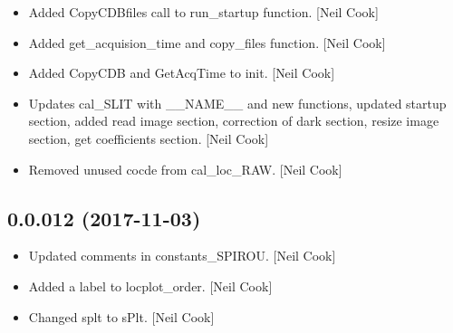 \documentclass[a4paper,10pt,english]{report}
\begin{document}
\begin{itemize}
\item {} 
Added CopyCDBfiles call to run\_startup function. {[}Neil Cook{]}

\item {} 
Added get\_acquision\_time and copy\_files function. {[}Neil Cook{]}

\item {} 
Added CopyCDB and GetAcqTime to init. {[}Neil Cook{]}

\item {} 
Updates cal\_SLIT with \_\_NAME\_\_ and new functions, updated startup
section, added read image section, correction of dark section, resize
image section, get coefficients section. {[}Neil Cook{]}

\item {} 
Removed unused cocde from cal\_loc\_RAW. {[}Neil Cook{]}

\end{itemize}


\subsection{0.0.012 (2017-11-03)}
\label{\detokenize{misc/changelog:id537}}\begin{itemize}
\item {} 
Updated comments in constants\_SPIROU. {[}Neil Cook{]}

\item {} 
Added a label to locplot\_order. {[}Neil Cook{]}

\item {} 
Changed splt to sPlt. {[}Neil Cook{]}

\end{itemize}
\end{document}
